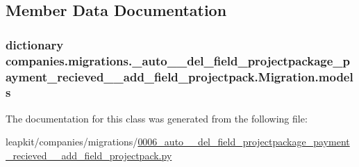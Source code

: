 \subsection{Member Data Documentation}
\hypertarget{classcompanies_1_1migrations_1_10006__auto____del__field__projectpackage__payment__recieved____a718d6be8a503b6c2d4c720ce698bce11_a550d12f01449626fda040f04049805cf}{
\subsubsection[{models}]{\setlength{\rightskip}{0pt plus 5cm}dictionary companies.\-migrations.\-\_\-auto\-\_\-\-\_\-del\-\_\-field\-\_\-projectpackage\-\_\-payment\-\_\-recieved\-\_\-\-\_\-add\-\_\-field\-\_\-projectpack.\-Migration.\-models\hspace{0.3cm}{\ttfamily [static]}}}\label{classcompanies_1_1migrations_1_10006__auto____del__field__projectpackage__payment__recieved____a718d6be8a503b6c2d4c720ce698bce11_a550d12f01449626fda040f04049805cf}


The documentation for this class was generated from the following file\-:\begin{DoxyCompactItemize}
\item 
leapkit/companies/migrations/\hyperlink{0006__auto____del__field__projectpackage__payment__recieved____add__field__projectpack_8py}{0006\-\_\-auto\-\_\-\-\_\-del\-\_\-field\-\_\-projectpackage\-\_\-payment\-\_\-recieved\-\_\-\-\_\-add\-\_\-field\-\_\-projectpack.\-py}\end{DoxyCompactItemize}
